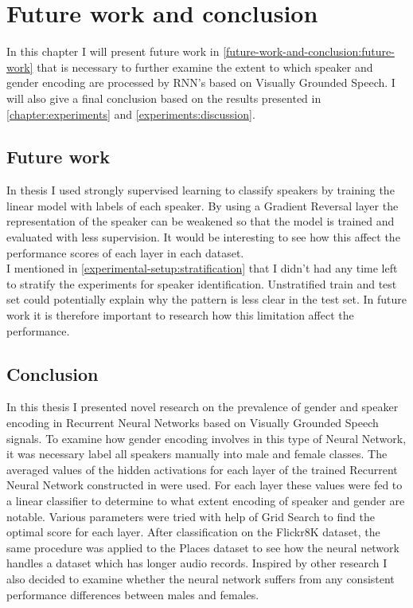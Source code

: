 \documentclass[a4paper, oneside]{book}
\begin{document}
\newpage	
	

\chapter{Future work and conclusion}\label{chapter:future-work-and-conclusion}

In this chapter I will present future work in \autoref{future-work-and-conclusion:future-work} that is necessary to further examine the extent to which speaker and gender encoding are processed by RNN's based on Visually Grounded Speech. I will also give a final conclusion based on the results presented in \autoref{chapter:experiments} and \autoref{experiments:discussion}.

\section{Future work}\label{future-work-and-conclusion:future-work}

In thesis I used strongly supervised learning to classify speakers by training the linear model with labels of each speaker. By using a Gradient Reversal layer \cite{ganin2016domain} the representation of the speaker can be weakened so that the model is trained and evaluated with less supervision. It would be interesting to see how this affect the performance scores of each layer in each dataset. \\

I mentioned in \autoref{experimental-setup:stratification} that I didn't had any time left to stratify the experiments for speaker identification. Unstratified train and test set could potentially explain why the pattern is less clear in the test set. In future work it is therefore important to research how this limitation affect the performance.

\section{Conclusion}\label{future-work-and-conclusion:conclusion}

In this thesis I presented novel research on the prevalence of gender and speaker encoding in Recurrent Neural Networks based on Visually Grounded Speech signals. To examine how gender encoding involves in this type of Neural Network, it was necessary label all speakers manually into male and female classes. The averaged values of the hidden activations for each layer of the trained Recurrent Neural Network constructed in \cite{ChrupalaGA17} were used. For each layer these values were fed to a linear classifier to determine to what extent encoding of speaker and gender are notable. Various parameters were tried with help of Grid Search to find the optimal score for each layer. After classification on the Flickr8K dataset, the same procedure was applied to the Places dataset to see how the neural network handles a dataset which has longer audio records. Inspired by other research I also decided to examine whether the neural network suffers from any consistent performance differences between males and females. \\
\end{document}

